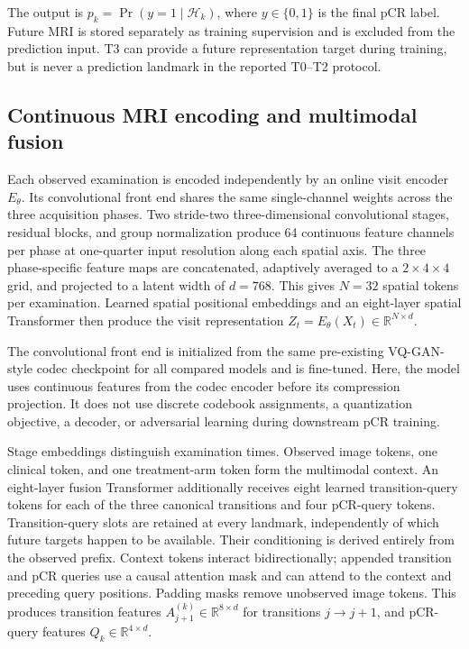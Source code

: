 The output is $p_k=\Pr(y=1\mid\mathcal{H}_k)$, where $y\in\{0,1\}$ is the final pCR label. Future MRI is stored separately as training supervision and is excluded from the prediction input. T3 can provide a future representation target during training, but is never a prediction landmark in the reported T0--T2 protocol.

\subsection{Continuous MRI encoding and multimodal fusion}
\label{sec:encoding}
Each observed examination is encoded independently by an online visit encoder $E_{\theta}$. Its convolutional front end shares the same single-channel weights across the three acquisition phases. Two stride-two three-dimensional convolutional stages, residual blocks, and group normalization produce 64 continuous feature channels per phase at one-quarter input resolution along each spatial axis. The three phase-specific feature maps are concatenated, adaptively averaged to a $2\times4\times4$ grid, and projected to a latent width of $d=768$. This gives $N=32$ spatial tokens per examination. Learned spatial positional embeddings and an eight-layer spatial Transformer then produce the visit representation $Z_t=E_{\theta}(X_t)\in\mathbb{R}^{N\times d}$.

The convolutional front end is initialized from the same pre-existing VQ-GAN-style codec checkpoint for all compared models and is fine-tuned. Here, the model uses continuous features from the codec encoder before its compression projection. It does not use discrete codebook assignments, a quantization objective, a decoder, or adversarial learning during downstream pCR training. 

Stage embeddings distinguish examination times. Observed image tokens, one clinical token, and one treatment-arm token form the multimodal context. An eight-layer fusion Transformer additionally receives eight learned transition-query tokens for each of the three canonical transitions and four pCR-query tokens. Transition-query slots are retained at every landmark, independently of which future targets happen to be available. Their conditioning is derived entirely from the observed prefix. Context tokens interact bidirectionally; appended transition and pCR queries use a causal attention mask and can attend to the context and preceding query positions. Padding masks remove unobserved image tokens. This produces transition features $A_{j+1}^{(k)}\in\mathbb{R}^{8\times d}$ for transitions $j\rightarrow j+1$, and pCR-query features $Q_k\in\mathbb{R}^{4\times d}$.

